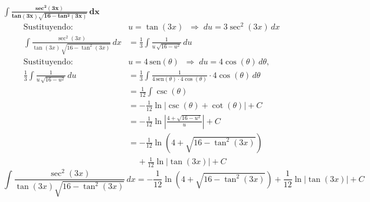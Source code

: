 $\displaystyle \mathbf{
\int \frac{sec^{2}\left(3x\right)}{tan\left(3x\right) \sqrt{16 - tan^{2}\left(3x\right)}}\,dx
}$
\nopagebreak
\begin{align*}
\text{Sustituyendo: } &u = \tan(3x)
\;\;\Rightarrow\; du = 3\sec^{2}(3x)\,dx\\[6pt]
\int \frac{\sec^{2}(3x)}{\tan(3x)\,\sqrt{16 - \tan^{2}(3x)}}\,dx
&= \frac{1}{3}\int \frac{1}{u\,\sqrt{16 - u^{2}}}\,du \\[6pt]
\text{Sustituyendo: } &u = 4\,\text{sen}\left(\theta\right)
\;\;\Rightarrow\; du = 4\cos(\theta)\,d\theta, \\[6pt]
\frac{1}{3}\int \frac{1}{u\,\sqrt{16- u^{2}}}\,du
&= \frac{1}{3}\int \frac{1}{4\, \text{sen} \left(\theta\right)\cdot 4\cos(\theta)}\cdot 4\cos(\theta)\,d\theta \\[6pt]
&= \frac{1}{12}\int \csc(\theta) \\[6pt]
&= -\frac{1}{12}\ln \left|\csc(\theta)+\cot(\theta)\right|+ C\\[6pt]
&= -\frac{1}{12}\ln \left|\frac{4+\sqrt{16-u^{2}}}{u}\right|+ C\\[6pt]
&= -\frac{1}{12}\ln \left(4+\sqrt{16-\tan^{2}(3x)}\right)\\[6pt]
&\;\;\;\; +\frac{1}{12}\ln \left|\tan(3x)\right|+C
\end{align*}
\[
\boxed{\displaystyle 
\int \frac{\sec^{2}(3x)}{\tan(3x) \sqrt{16 - \tan^{2}(3x)}}\,dx
=  -\frac{1}{12}\ln \left(4+\sqrt{16-\tan^{2}(3x)}\right)+\frac{1}{12}\ln \left|\tan(3x)\right|+C
}
\]
